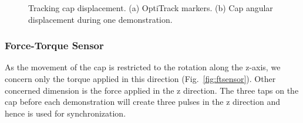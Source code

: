 \begin{figure}
  \centering
  \hspace{0.5cm}
  \caption{ \scriptsize{Tracking cap displacement. (a) OptiTrack markers. (b) Cap angular displacement during one demonstration. }
  \label{fig:optitrack}
}
\end{figure}

\subsubsection{Force-Torque Sensor}
\label{ftsensor}
As the movement of the cap is restricted to the rotation along the z-axis, we concern only the torque applied in this direction  (Fig.~\ref{fig:ftsensor}). Other concerned dimension is the force applied in the z direction. The three taps on the cap before each demonstration will create three pulses in the z direction and hence is used for synchronization.



